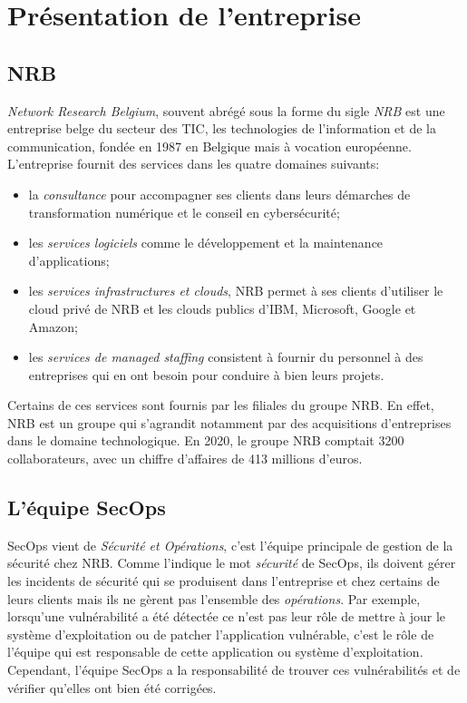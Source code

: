 \section{Présentation de l'entreprise}



\subsection{NRB}

\textit{Network Research Belgium}, souvent abrégé sous la forme du sigle \textit{NRB} est une entreprise belge du secteur des TIC, les technologies de l'information et de la communication, fondée en 1987 en Belgique mais à vocation européenne. L'entreprise fournit des services dans les quatre domaines suivants:
\begin{itemize}
    \item la \textit{consultance} pour accompagner ses clients dans leurs démarches de transformation numérique et le conseil en cybersécurité;
    \item les \textit{services logiciels} comme le développement et la maintenance d'applications;
    \item les \textit{services infrastructures et clouds}, NRB permet à ses clients d'utiliser le cloud privé de NRB et les clouds publics d'IBM, Microsoft, Google et Amazon;
    \item les \textit{services de managed staffing} consistent à fournir du personnel à des entreprises qui en ont besoin pour conduire à bien leurs projets.
\end{itemize}

Certains de ces services sont fournis par les filiales du groupe NRB. En effet, NRB est un groupe qui s'agrandit notamment par des acquisitions d'entreprises dans le domaine technologique. En 2020, le groupe NRB comptait 3200 collaborateurs, avec un chiffre d'affaires de 413 millions d'euros.



\subsection{L'équipe SecOps}

SecOps vient de \textit{Sécurité et Opérations}, c'est l'équipe principale de gestion de la sécurité chez NRB. Comme l'indique le mot \textit{sécurité} de SecOps, ils doivent gérer les incidents de sécurité qui se produisent dans l'entreprise et chez certains de leurs clients mais ils ne gèrent pas l'ensemble des \textit{opérations}. Par exemple, lorsqu'une vulnérabilité a été détectée ce n'est pas leur rôle de mettre à jour le système d'exploitation ou de patcher l'application vulnérable, c'est le rôle de l'équipe qui est responsable de cette application ou système d'exploitation. Cependant, l'équipe SecOps a la responsabilité de trouver ces vulnérabilités et de vérifier qu'elles ont bien été corrigées.

